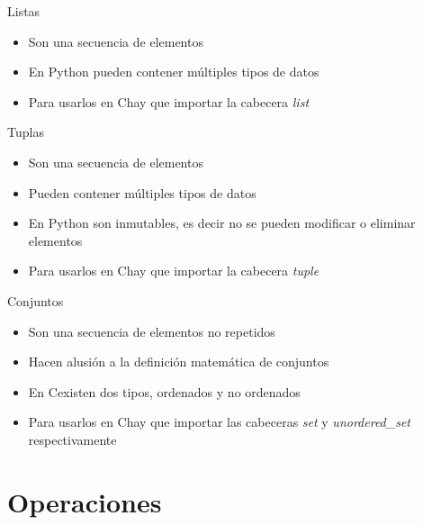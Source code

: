 \documentclass{beamer}
\newcommand{\Rplus}{\protect\hspace{-.1em}\protect\raisebox{.35ex}{\smaller{\smaller\textbf{+}}}}
\newcommand{\Cpp}{\mbox{C\Rplus\Rplus}\hspace{3pt}}
\begin{document}
\begin{frame}{Listas}
    \begin{itemize}
        \item Son una secuencia de elementos
        \item En Python pueden contener m\'ultiples tipos de datos
        \item Para usarlos en \Cpp hay que importar la cabecera \textit{list}
    \end{itemize}
\end{frame}

\begin{frame}{Tuplas}
    \begin{itemize}
        \item Son una secuencia de elementos
        \item Pueden contener m\'ultiples tipos de datos
        \item En Python son inmutables, es decir no se pueden modificar o eliminar elementos
        \item Para usarlos en \Cpp hay que importar la cabecera \textit{tuple}
    \end{itemize}
\end{frame}

\begin{frame}{Conjuntos}
    \begin{itemize}
        \item Son una secuencia de elementos no repetidos
        \item Hacen alusi\'on a la definici\'on matem\'atica de conjuntos
        \item En \Cpp existen dos tipos, ordenados y no ordenados
        \item Para usarlos en \Cpp hay que importar las cabeceras \textit{set} y \textit{unordered\_set} respectivamente\nocite{BHASIN,BJARNE1,BJARNE2,CAIRO,CPP,DEITEL,DOWNEY,JAWORSKI,KENN,lAAKMANN,MATTHES,RAMALHO,SED}
    \end{itemize}
\textbf{}\end{frame}

\section{Operaciones}
\end{document}
